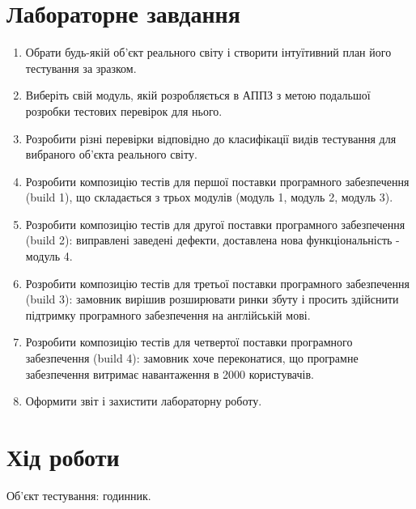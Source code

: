 \documentclass[oneside,14pt]{extarticle}
\begin{document}
\begin{normalsize}
    \section*{Лабораторне завдання}
    \begin{enumerate}
    	\item Обрати будь-якій об’єкт реального світу і створити інтуїтивний план
    	його тестування за зразком.
    	\item Виберіть свій модуль, якій розробляється в АППЗ з метою подальшої
    	розробки тестових перевірок для нього.
    	\item Розробити різні перевірки відповідно до класифікації видів тестування
    	для вибраного об'єкта реального світу.
    	\item Розробити композицію тестів для першої поставки програмного
    	забезпечення (build 1), що складається з трьох модулів (модуль 1, модуль 2,
    	модуль 3).
    	\item Розробити композицію тестів для другої поставки програмного
    	забезпечення (build 2): виправлені заведені дефекти, доставлена нова
    	функціональність - модуль 4.
    	\item Розробити композицію тестів для третьої поставки програмного
    	забезпечення (build 3): замовник вирішив розширювати ринки збуту і просить
    	здійснити підтримку програмного забезпечення на англійській мові.
    	\item Розробити композицію тестів для четвертої поставки програмного
    	забезпечення (build 4): замовник хоче переконатися, що програмне
    	забезпечення витримає навантаження в 2000 користувачів.
    	\item Оформити звіт і захистити лабораторну роботу.
    \end{enumerate}
	\section*{Хід роботи}
	
	Об'єкт тестування: годинник.
	

\end{normalsize}
\end{document}

